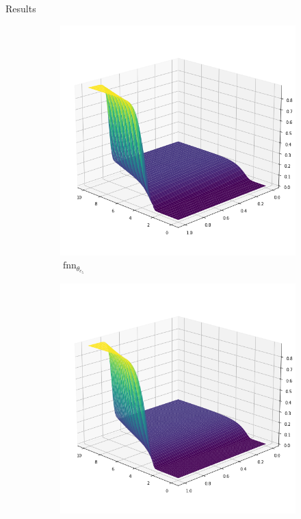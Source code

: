 \documentclass[9pt]{beamer}
\begin{document}
\begin{frame}{Results}
    \begin{figure}[H]
        \begin{center}
            \begin{subfigure}[b]{0.4\textwidth}
                \begin{center}
                    \includegraphics[scale=0.25]{img/Kante5.png}
                \end{center}
                \caption{$\operatorname{fnn}_{\theta_{e_5}}$}
            \end{subfigure} \hspace{10mm}
            \begin{subfigure}[b]{0.4\textwidth}
                \begin{center}
                    \includegraphics[scale=0.25]{img/FVM5.png}

\end{center}
\end{subfigure}
\end{center}
\end{figure}
\end{frame}
\end{document}
